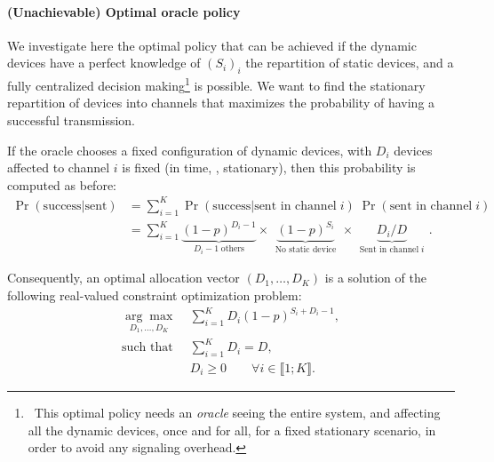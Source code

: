 \paragraph{(Unachievable) Optimal oracle policy}

We investigate here the optimal policy that can be achieved if the dynamic devices have a perfect knowledge of $(S_i)_i$ the repartition of static devices, and a fully centralized decision making\footnote{~This optimal policy needs an \emph{oracle} seeing the entire system, and affecting all the dynamic devices, once and for all, for a fixed stationary scenario, in order to avoid any signaling overhead.} is possible.
We want to find the stationary repartition of devices into channels that maximizes the probability of having a successful transmission.

If the oracle chooses a fixed configuration of dynamic devices, with $D_i$ devices affected to channel $i$ is fixed (in time, \ie, stationary),
then this probability is computed as before:
\begin{align}\label{eq:41:prob_col}
    \Pr(\text{success}|\text{sent})
    & = \sum_{i=1}^{K} \Pr(\text{success}|\text{sent in channel}\;i) \; \Pr(\text{sent in channel}\;i) \nonumber \\
    & = \sum_{i=1}^{K} \underbrace{(1 - p)^{D_i - 1}}_{\;\;D_i - 1 \;\text{others}\;\;} \times \underbrace{(1 - p)^{S_i}}_{\;\;\text{No static device}\;\;} \times \underbrace{ D_i / D }_{\;\;\text{Sent in channel}\; i\;\;}.
\end{align}

Consequently, an optimal allocation vector $(D_1,\dots,D_{K})$ is a solution of the following real-valued constraint optimization problem:
%
\begin{subequations}\label{eq:41:prob}
\begin{align}
    \underset{D_1,\dots,D_{K}}{\arg\max}\; & \sum_{i=1}^{K} D_i (1 - p)^{S_i + D_i -1}, \label{eq:41:optPb}\\
    \text{such that}\;\; & \sum_{i=1}^{K} D_i = D, \label{eq:41:eqCstr}\\
    & D_i \geq 0 \qquad \forall i\in\llbracket 1;K\rrbracket . \label{eq:41:ineqCstr}
\end{align}
\end{subequations}


